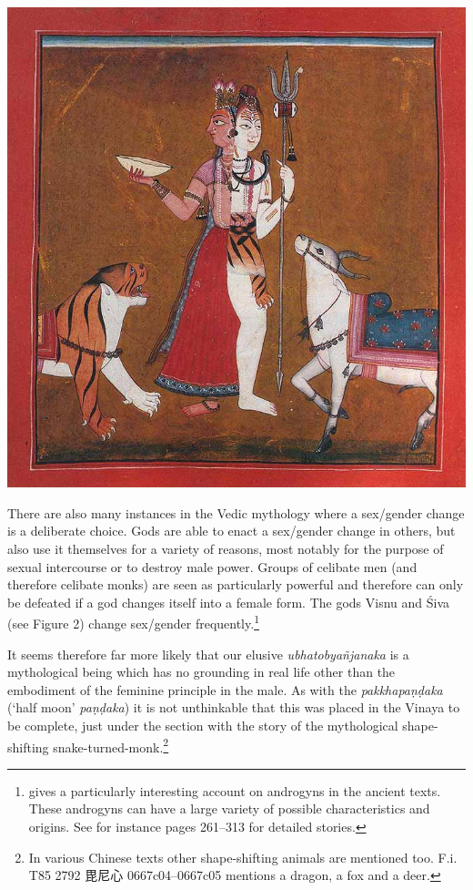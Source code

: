 \bigskip
\includegraphics[width=\textwidth]{androgyne.jpg}
\begin{minipage}{\textwidth}
\end{minipage}
\label{siva}

There are also many instances in the Vedic mythology where a sex/gender change is a deliberate choice. Gods are able to enact a sex/gender change in others, but also use it themselves for a variety of reasons, most notably for the purpose of sexual intercourse or to destroy male power. Groups of celibate men (and therefore celibate monks) are seen as particularly powerful and therefore can only be defeated if a god changes itself into a female form. The gods Visnu and Śiva (see Figure 2) change sex/gender frequently.\footnote{\cite{wendy} gives a particularly interesting account on androgyns in the ancient texts. These androgyns can have a large variety of possible characteristics and origins. See for instance pages 261–313 for detailed stories.}

It seems therefore far more likely that our elusive {\em ubhatob­yañ­janaka} is a mythological being which has no grounding in real life other than the embodiment of the feminine principle in the male. As with the {\em pakkhapaṇḍaka} (`half moon' {\em paṇḍaka}) it is not unthinkable that this was placed in the Vinaya to be complete, just under the section with the story of the mythological shape-shifting snake-turned-monk.\footnote{In various Chinese texts other shape-shifting animals are mentioned too. F.i. T85 2792 毘尼心 0667c04–0667c05 mentions a dragon, a fox and a deer.}


